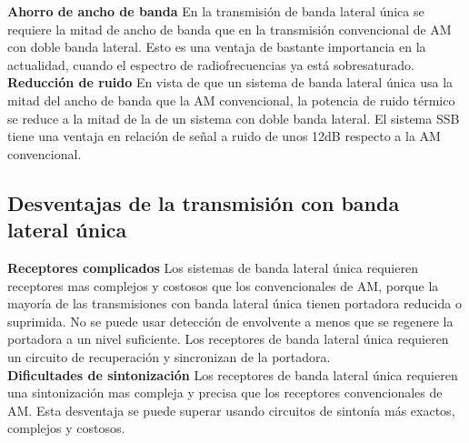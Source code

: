\documentclass[10pt,a4paper]{article}
\begin{document}
\textbf{Ahorro de ancho de banda} En la transmisión de banda lateral única se requiere la mitad de ancho de banda que en la transmisión convencional de AM con doble banda lateral. Esto es una ventaja de bastante importancia en la actualidad, cuando el espectro de radiofrecuencias ya está sobresaturado.\\

\textbf{Reducción de ruido} En vista de que un sistema de banda lateral única usa la mitad del ancho de banda que la AM convencional, la potencia de ruido térmico se reduce a la mitad de la de un sistema con doble banda lateral. El sistema SSB tiene una ventaja en relación de señal a ruido de unos 12dB respecto a la AM convencional.\\

\subsection{Desventajas de la transmisión con banda lateral única}
\textbf{Receptores complicados} Los sistemas de banda lateral única requieren receptores mas complejos y costosos que los convencionales de AM, porque la mayoría de las transmisiones con banda lateral única tienen portadora reducida o suprimida. No se puede usar detección de envolvente a menos que se regenere la portadora a un nivel suficiente. Los receptores de banda lateral única requieren un circuito de recuperación y sincronizan de la portadora.\\

\textbf{Dificultades de sintonización} Los receptores de banda lateral única requieren una sintonización mas compleja y precisa que los receptores convencionales de AM. Esta desventaja se puede superar usando circuitos de sintonía más exactos, complejos y costosos.\\
\end{document}
